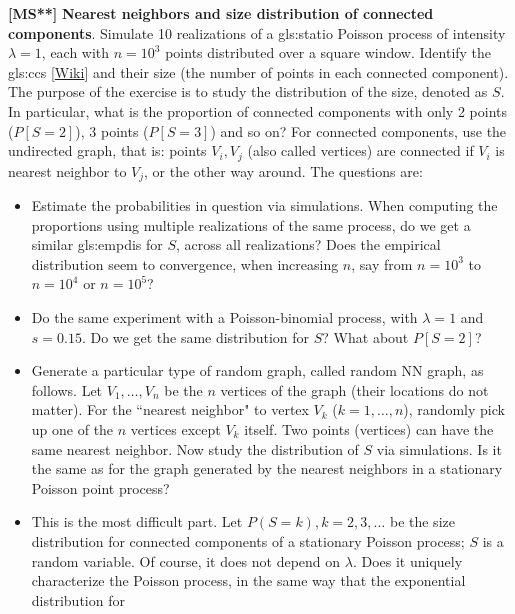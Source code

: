 \documentclass[10pt]{article}
\begin{document}
\begin{Exercise}\label{exercise14g}{\bf [MS**]} {\bf Nearest neighbors and size distribution of connected components}. Simulate
10 realizations of a \gls{gls:statio} Poisson process of intensity $\lambda=1$, each with $n=10^3$ points distributed over a square window. Identify the 
\glspl{gls:cc} 
 [\href{https://en.wikipedia.org/wiki/Component_(graph_theory)}{Wiki}]
and their size (the number of points in each connected component). 
The purpose of the exercise is to study
the distribution of the size, denoted as $S$. In particular, what is the proportion of connected components with only 2 points ($P[S=2]$), 3 points
($P[S=3]$) and so on? For connected components, 
use the 
\textcolor{index}{undirected graph}, 
that is: points $V_i,V_j$ (also called vertices) are connected if $V_i$ is nearest neighbor to $V_j$, or the other way around.
The questions are:
\begin{itemize}
\item Estimate the probabilities in question via simulations. When computing the proportions using multiple realizations of the same process,
do we get a similar 
 \gls{gls:empdis} for $S$, across all realizations? Does the empirical distribution seem to convergence, when  increasing $n$, say from $n=10^3$ to $n=10^4$ or $n=10^5$?
\item Do the same experiment with a Poisson-binomial process, with $\lambda=1$ and $s=0.15$. Do we get the same distribution for $S$? What
about $P[S=2]$?
\item Generate a particular type of 
\textcolor{index}{random graph}, called \textcolor{index}{random NN graph}, as follows. Let $V_1,\dots,V_n$ be the $n$ 
\textcolor{index}{vertices} of the graph (their locations do not matter). For the ``nearest neighbor" to vertex $V_k$ ($k=1,\dots, n$), randomly pick up one of the $n$ vertices except $V_k$ itself. Two points (vertices) can have the same nearest neighbor. 
Now study the distribution of $S$ via simulations. Is it the same as for the graph generated by the nearest neighbors in a stationary Poisson point process?
\item This is the most difficult part. Let $P(S=k), k=2,3,\dots$ be the size distribution for connected components of a stationary Poisson process; $S$ is a random variable. Of course, it does not depend on $\lambda$. Does it uniquely characterize the Poisson process, in the same way that the exponential distribution for 

\end{itemize}
\end{Exercise}
\end{document}
